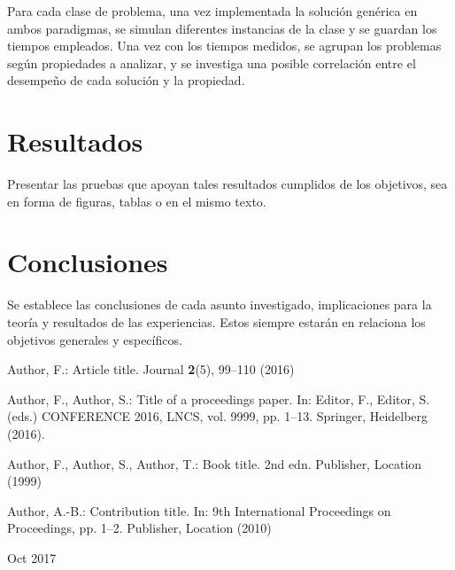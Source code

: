\documentclass[12pt]{report}
\begin{document}
Para cada clase de problema, una vez implementada la solución genérica en ambos paradigmas, se simulan diferentes instancias de la clase y se guardan los tiempos empleados. Una vez con los tiempos medidos, se agrupan los problemas según propiedades a analizar, y se investiga una posible correlación entre el desempeño de cada solución y la propiedad.

\chapter{Resultados}
Presentar las pruebas que apoyan tales resultados cumplidos de los objetivos, sea en forma de figuras, tablas o en el mismo texto. 
\chapter{Conclusiones}
Se establece las conclusiones de cada asunto investigado, implicaciones para la teoría y resultados de las
experiencias. Estos siempre estarán en relaciona los objetivos generales y específicos.

% 
% 

\begin{thebibliography}{8}
Author, F.: Article title. Journal \textbf{2}(5), 99--110 (2016)

Author, F., Author, S.: Title of a proceedings paper. In: Editor,
F., Editor, S. (eds.) CONFERENCE 2016, LNCS, vol. 9999, pp. 1--13.
Springer, Heidelberg (2016).

Author, F., Author, S., Author, T.: Book title. 2nd edn. Publisher,
Location (1999)

Author, A.-B.: Contribution title. In: 9th International Proceedings
on Proceedings, pp. 1--2. Publisher, Location (2010)

Oct 2017
\end{thebibliography}
\end{document}
